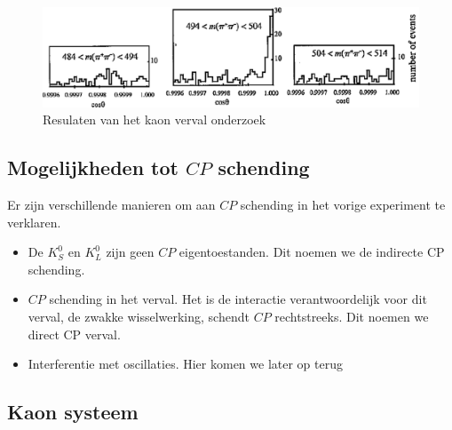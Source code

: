 \documentclass[../main.tex]{subfiles}
\begin{document}
\begin{figure}[h]
    \centering
    \includegraphics[width=0.8\linewidth]{cp_violation/kaon_verval_exp_res.png}
    \caption{Resulaten van het kaon verval onderzoek}%
    \label{fig:cp_violation/kaon_verval_exp_res}
\end{figure}

\subsection{Mogelijkheden tot $CP$ schending}%
\label{sub:mogelijkheden_tot_cp_schending}

Er zijn verschillende manieren om aan $CP$ schending in het vorige experiment te verklaren.
\begin{itemize}
    \item De $K_S^0$ en $K_L^0$ zijn geen $CP$ eigentoestanden. Dit noemen we de indirecte CP schending.
    \item $CP$ schending in het verval. Het is de interactie verantwoordelijk voor dit verval, de zwakke wisselwerking, schendt $CP$ rechtstreeks. Dit noemen we direct CP verval.
    \item Interferentie met oscillaties. Hier komen we later op terug
\end{itemize}

\subsection{Kaon systeem}%
\label{sub:kaon_systeem}
\end{document}
